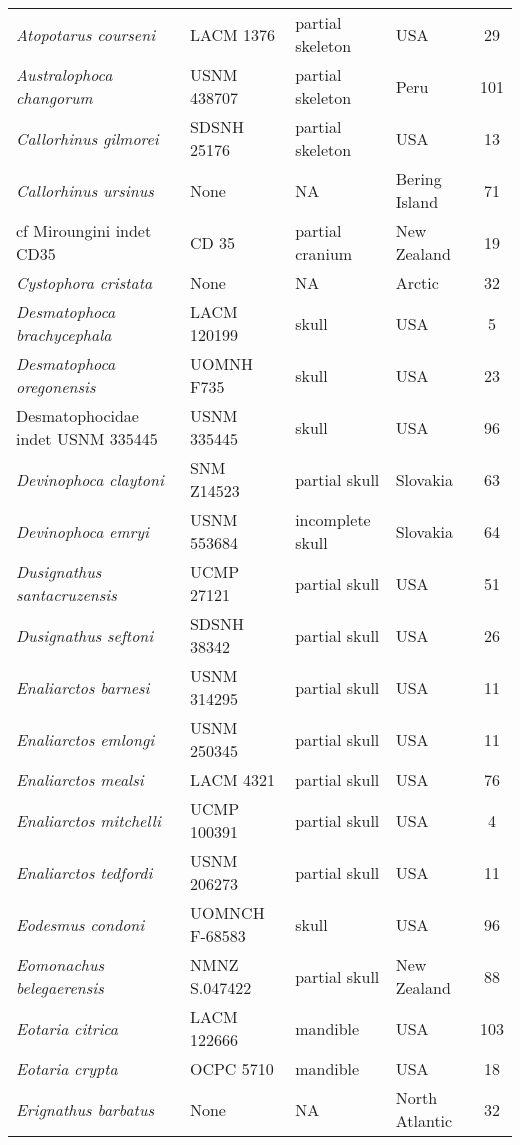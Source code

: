 \begin{longtable}{p{}p{}p{}lc}
\textit{Atopotarus courseni} & 	LACM 1376 & partial skeleton & 	USA & 29\\
\textit{Australophoca changorum} & 	USNM 438707 & partial skeleton & 	Peru & 	101\\
\textit{Callorhinus gilmorei} & 	SDSNH 25176 & partial skeleton & 	USA & 13\\
\textit{Callorhinus ursinus} & 	None & 	NA & 	Bering Island & 71\\
cf Miroungini indet CD35	& CD 35 & 	partial cranium & 	New Zealand & 19\\
\textit{Cystophora cristata} & 	None & 	NA & 	Arctic & 32\\
\textit{Desmatophoca brachycephala} &	LACM 120199 & 	skull & 	USA & 5\\
\textit{Desmatophoca oregonensis} &	UOMNH F735 & 	skull & 	USA & 23\\
Desmatophocidae indet USNM 335445 &	USNM 335445 & 	skull & 	USA & 96\\
\textit{Devinophoca claytoni} &	SNM Z14523 & 	partial skull & 	Slovakia & 63\\
\textit{Devinophoca emryi} &	USNM 553684 & 	incomplete skull & 	Slovakia & 	64\\
\textit{Dusignathus santacruzensis} &	UCMP 27121 & 	partial skull & 	USA & 51\\
\textit{Dusignathus seftoni} &	SDSNH 38342 & 	partial skull & 	USA & 26\\
\textit{Enaliarctos barnesi} &	USNM 314295 & 	partial skull & 	USA & 11\\
\textit{Enaliarctos emlongi} &	USNM 250345 & 	partial skull & 	USA & 11\\
\textit{Enaliarctos mealsi} &	LACM 4321 & 	partial skull & 	USA & 76\\
\textit{Enaliarctos mitchelli} &	UCMP 100391 & 	partial skull & 	USA & 4\\
\textit{Enaliarctos tedfordi} &	USNM 206273 & 	partial skull & 	USA & 11\\
\textit{Eodesmus condoni} &	UOMNCH F-68583 & 	skull & 	USA & 96\\
\textit{Eomonachus belegaerensis} &	NMNZ S.047422 & 	partial skull & 	New Zealand & 88\\
\textit{Eotaria citrica} &	LACM 122666 & 	mandible & 	USA & 103\\
\textit{Eotaria crypta} &	OCPC 5710 & 	mandible & 	USA & 18\\
\textit{Erignathus barbatus} &	None & 	NA & 	North Atlantic & 32\\

\end{longtable}
